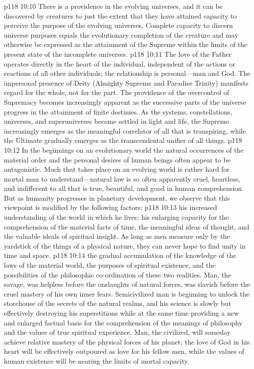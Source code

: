 \vs p118 10:10 There is a providence in the evolving universes, and it can be discovered by creatures to just the extent that they have attained capacity to perceive the purpose of the evolving universes. Complete capacity to discern universe purposes equals the evolutionary completion of the creature and may otherwise be expressed as the attainment of the Supreme within the limits of the present state of the incomplete universes.
\vs p118 10:11 The love of the Father operates directly in the heart of the individual, independent of the actions or reactions of all other individuals; the relationship is personal---man and God. The impersonal presence of Deity (Almighty Supreme and Paradise Trinity) manifests regard for the whole, not for the part. The providence of the overcontrol of Supremacy becomes increasingly apparent as the successive parts of the universe progress in the attainment of finite destinies. As the systems, constellations, universes, and superuniverses become settled in light and life, the Supreme increasingly emerges as the meaningful correlator of all that is transpiring, while the Ultimate gradually emerges as the transcendental unifier of all things.
\pc \vs p118 10:12 In the beginnings on an evolutionary world the natural occurrences of the material order and the personal desires of human beings often appear to be antagonistic. Much that takes place on an evolving world is rather hard for mortal man to understand---natural law is so often apparently cruel, heartless, and indifferent to all that is true, beautiful, and good in human comprehension. But as humanity progresses in planetary development, we observe that this viewpoint is modified by the following factors:
\pc \vs p118 10:13 \bibnobreakspace {}his increased understanding of the world in which he lives; his enlarging capacity for the comprehension of the material facts of time, the meaningful ideas of thought, and the valuable ideals of spiritual insight. As long as men measure only by the yardstick of the things of a physical nature, they can never hope to find unity in time and space.
\pc \vs p118 10:14 \bibnobreakspace {}the gradual accumulation of the knowledge of the laws of the material world, the purposes of spiritual existence, and the possibilities of the philosophic co\hyp{}ordination of these two realities. Man, the savage, was helpless before the onslaughts of natural forces, was slavish before the cruel mastery of his own inner fears. Semicivilized man is beginning to unlock the storehouse of the secrets of the natural realms, and his science is slowly but effectively destroying his superstitions while at the same time providing a new and enlarged factual basis for the comprehension of the meanings of philosophy and the values of true spiritual experience. Man, the civilized, will someday achieve relative mastery of the physical forces of his planet; the love of God in his heart will be effectively outpoured as love for his fellow men, while the values of human existence will be nearing the limits of mortal capacity.
